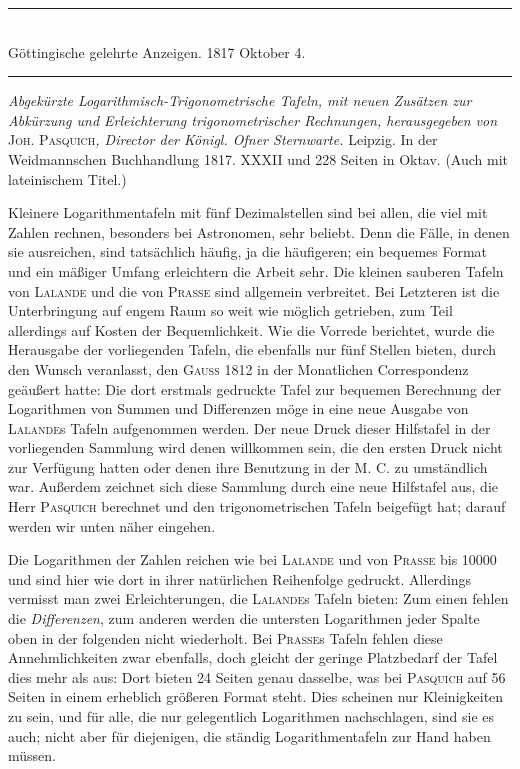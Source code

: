 \par{}
\begin{center}
\rule{0.65\linewidth}{0.4pt}\\
Göttingische gelehrte Anzeigen. 1817 Oktober 4.\\
\rule{0.65\linewidth}{0.4pt}
\end{center}

\textit{Abgekürzte Logarithmisch-Trigonometrische Tafeln, mit neuen Zusätzen zur
Abkürzung und Erleichterung trigonometrischer Rechnungen, herausgegeben von }\textsc{Joh.}
\textsc{Pasquich}\textit{, Director der Königl. Ofner Sternwarte.} Leipzig. In der Weidmannschen Buchhandlung 1817. XXXII und 228 Seiten in Oktav. (Auch mit lateinischem Titel.)
\par{}
Kleinere Logarithmentafeln mit fünf Dezimalstellen sind bei allen, die viel mit Zahlen rechnen, besonders bei Astronomen, sehr beliebt. Denn die Fälle, in denen sie ausreichen, sind tatsächlich häufig, ja die häufigeren; ein bequemes Format und ein mäßiger Umfang erleichtern die Arbeit sehr. Die kleinen sauberen Tafeln von \textsc{Lalande} und die von \textsc{Prasse} sind allgemein verbreitet. Bei Letzteren ist die Unterbringung auf engem Raum so weit wie möglich getrieben, zum Teil allerdings auf Kosten der Bequemlichkeit. Wie die Vorrede berichtet, wurde die Herausgabe der vorliegenden Tafeln, die ebenfalls nur fünf Stellen bieten, durch den Wunsch veranlasst, den \textsc{Gauss} 1812 in der Monatlichen Correspondenz geäußert hatte: Die dort erstmals gedruckte Tafel zur bequemen Berechnung der Logarithmen von Summen und Differenzen möge in eine neue Ausgabe von \textsc{Lalande}s Tafeln aufgenommen werden. Der neue Druck dieser Hilfstafel in der vorliegenden Sammlung wird denen willkommen sein, die den ersten Druck nicht zur Verfügung hatten oder denen ihre Benutzung in der M. C. zu umständlich war. Außerdem zeichnet sich diese Sammlung durch eine neue Hilfstafel aus, die Herr \textsc{Pasquich} berechnet und den trigonometrischen Tafeln beigefügt hat; darauf werden wir unten näher eingehen.

Die Logarithmen der Zahlen reichen wie bei \textsc{Lalande} und von \textsc{Prasse} bis 10000 und sind hier wie dort in ihrer natürlichen Reihenfolge gedruckt. Allerdings vermisst man zwei Erleichterungen, die \textsc{Lalande}s Tafeln bieten: Zum einen fehlen die \textit{Differenzen}, zum anderen werden die untersten Logarithmen jeder Spalte oben in der folgenden nicht wiederholt. Bei \textsc{Prasse}s Tafeln fehlen diese Annehmlichkeiten zwar ebenfalls, doch gleicht der geringe Platzbedarf der Tafel dies mehr als aus: Dort bieten 24 Seiten genau dasselbe, was bei \textsc{Pasquich} auf 56 Seiten in einem erheblich größeren Format steht. Dies scheinen nur Kleinigkeiten zu sein, und für alle, die nur gelegentlich Logarithmen nachschlagen, sind sie es auch; nicht aber für diejenigen, die ständig Logarithmentafeln zur Hand haben müssen.


